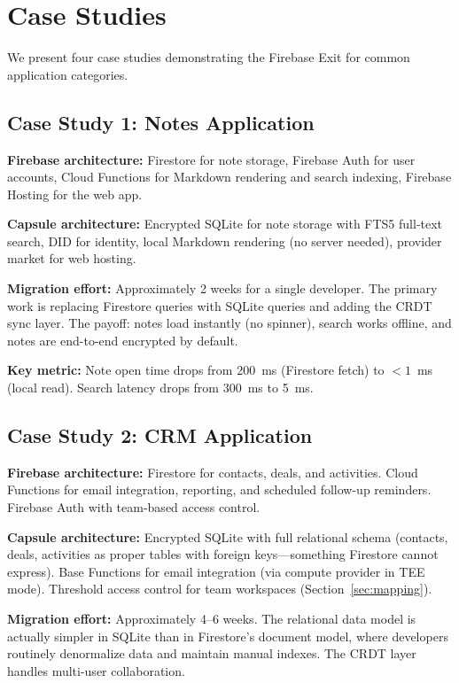 \section{Case Studies}
\label{sec:cases}

We present four case studies demonstrating the Firebase Exit for common
application categories.

\subsection{Case Study 1: Notes Application}

\textbf{Firebase architecture:} Firestore for note storage, Firebase Auth
for user accounts, Cloud Functions for Markdown rendering and search
indexing, Firebase Hosting for the web app.

\textbf{Capsule architecture:} Encrypted SQLite for note storage with
FTS5 full-text search, DID for identity, local Markdown rendering (no
server needed), provider market for web hosting.

\textbf{Migration effort:} Approximately 2 weeks for a single developer.
The primary work is replacing Firestore queries with SQLite queries and
adding the CRDT sync layer. The payoff: notes load instantly (no spinner),
search works offline, and notes are end-to-end encrypted by default.

\textbf{Key metric:} Note open time drops from 200~ms (Firestore fetch)
to $<1$~ms (local read). Search latency drops from 300~ms to 5~ms.

\subsection{Case Study 2: CRM Application}

\textbf{Firebase architecture:} Firestore for contacts, deals, and
activities. Cloud Functions for email integration, reporting, and
scheduled follow-up reminders. Firebase Auth with team-based access control.

\textbf{Capsule architecture:} Encrypted SQLite with full relational
schema (contacts, deals, activities as proper tables with foreign keys---something
Firestore cannot express). Base Functions for email integration (via
compute provider in TEE mode). Threshold access control for team
workspaces (Section~\ref{sec:mapping}).

\textbf{Migration effort:} Approximately 4--6 weeks. The relational
data model is actually simpler in SQLite than in Firestore's document
model, where developers routinely denormalize data and maintain manual
indexes. The CRDT layer handles multi-user collaboration.

